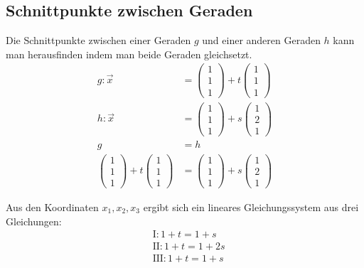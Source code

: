 \subsection{Schnittpunkte zwischen Geraden}
\begin{flushleft}
Die Schnittpunkte zwischen einer Geraden $g$ und einer anderen Geraden $h$ kann man herausfinden indem man beide Geraden gleichsetzt.
\begin{align}
    g\colon\vec{x}&=\begin{pmatrix} 1 \\ 1 \\ 1 \end{pmatrix}+t\begin{pmatrix} 1 \\ 1 \\ 1 \end{pmatrix} \\
    h\colon\vec{x}&=\begin{pmatrix} 1 \\ 1 \\ 1 \end{pmatrix}+s\begin{pmatrix} 1 \\ 2 \\ 1 \end{pmatrix} \\
    g&=h \\
    \begin{pmatrix} 1 \\ 1 \\ 1 \end{pmatrix}+t\begin{pmatrix} 1 \\ 1 \\ 1 \end{pmatrix}&=\begin{pmatrix} 1 \\ 1 \\ 1 \end{pmatrix}+s\begin{pmatrix} 1 \\ 2 \\ 1 \end{pmatrix}
\end{align}

Aus den Koordinaten $x_1,x_2,x_3$ ergibt sich ein lineares Gleichungssystem aus drei Gleichungen:
\begin{align}
    &\text{I}\colon1+t=1+s \\
    &\text{II}\colon1+t=1+2s \\
    &\text{III}\colon1+t=1+s
\end{align}


\end{flushleft}
